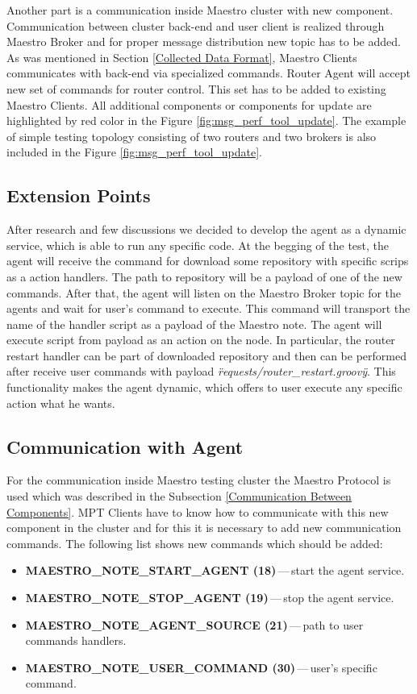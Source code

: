 Another part is a communication inside Maestro cluster with new component. Communication between cluster back-end and user client is realized through Maestro Broker and for proper message distribution new topic has to be added. As was mentioned in Section \ref{Collected Data Format}, Maestro Clients communicates with back-end via specialized commands. Router Agent will accept new set of commands for router control. This set has to be added to existing Maestro Clients. All additional components or components for update are highlighted by red color in the Figure \ref{fig:msg_perf_tool_update}. The example of simple testing topology consisting of two routers and two brokers is also included in the Figure \ref{fig:msg_perf_tool_update}.


\subsection{Extension Points}
\label{Extension Points}
After research and few discussions we decided to develop the agent as a dynamic service, which is able to run any specific code. At the begging of the test, the agent will receive the command for download some repository with specific scrips as a action handlers. The path to repository will be a payload of one of the new commands. After that, the agent will listen on the Maestro Broker topic for the agents and wait for user's command to execute. This command will transport the name of the handler script as a payload of the Maestro note. The agent will execute script from payload as an action on the node. In particular, the router restart handler can be part of downloaded repository and then can be performed after receive user commands with payload \emph{\"requests/router\_restart.groovy\"}. This functionality makes the agent dynamic, which offers to user execute any specific action what he wants.


\subsection{Communication with Agent}
\label{Communication with Agent}
For the communication inside Maestro testing cluster the Maestro Protocol is used which was described in the Subsection \ref{Communication Between Components}. MPT Clients have to know how to communicate with this new component in the cluster and for this it is necessary to add new communication commands. The following list shows new commands which should be added:

\begin{itemize}
	\setlength\itemsep{0em}
	\item \textbf{MAESTRO\_NOTE\_START\_AGENT (18)}\,---\,start the agent service.
	\item \textbf{MAESTRO\_NOTE\_STOP\_AGENT (19)}\,---\,stop the agent service.
	\item \textbf{MAESTRO\_NOTE\_AGENT\_SOURCE (21)}\,---\,path to user commands handlers.
	\item \textbf{MAESTRO\_NOTE\_USER\_COMMAND (30)}\,---\,user's specific command.
\end{itemize}

